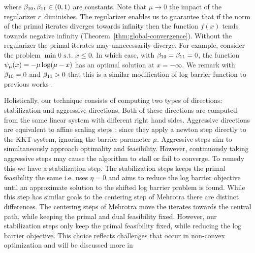 \documentclass{article}
\begin{document}
where $\beta_{10}, \beta_{11} \in (0,1)$ are constants. Note that $\mu \rightarrow 0$ the impact of the regularizer $r$ diminishes. The regularizer enables us to guarantee that if the norm of the primal iterates diverges towards infinity then the function $f(x)$ tends towards negative infinity (Theorem~\ref{thm:global-convergence}). Without the regularizer the primal iterates may unnecessarily diverge. For example, consider the problem $\min{ 0 } \text{ s.t. }  x \le 0$. In which case, with $\beta_{10}  = \beta_{11} = 0$, the function $\psi_{\mu}(x) = - \mu \log(\mu - x)$ has an optimal solution at $x = -\infty$. We remark with $\beta_{10} = 0$ and $\beta_{11} > 0$ that this is a similar modification of log barrier function to previous works  \cite[Section 3.7]{wachter2006implementation}.


Holistically, our technique consists of computing two types of directions: stabilization and aggressive directions. Both of these directions are computed from the same linear system with different right hand sides. Aggressive directions are equivalent to affine scaling steps \cite{mehrotra1992implementation}; since they apply a newton step directly to the KKT system, ignoring the barrier parameter $\mu$. Aggressive steps aim to simultaneously approach optimality and feasibility. However, continuously taking aggressive steps may cause the algorithm to stall or fail to converge. To remedy this we have a stabilization step. The stabilization steps keeps the primal feasibility the same i.e. uses $\eta = 0$ and aims to reduce the log barrier objective until an approximate solution to the shifted log barrier problem is found. While this step has similar goals to the centering step of Mehrotra there are distinct differences. The centering steps of Mehrotra move the iterates towards the central path, while keeping the primal and dual feasibility fixed. However, our stabilization steps only keep the primal feasibility fixed, while reducing the log barrier objective. This choice reflects challenges that occur in non-convex optimization and will be discussed more in 

\end{document}
